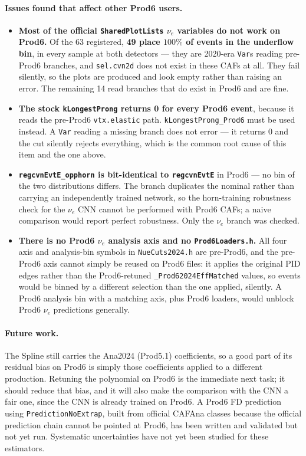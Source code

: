 \documentclass{article}
\begin{document}
\paragraph{Issues found that affect other Prod6 users.}
\begin{itemize}
  \setlength{\itemsep}{1pt}
  \item \textbf{Most of the official \texttt{SharedPlotLists} $\nu_e$ variables do
  not work on Prod6.} Of the 63 registered, \textbf{49 place $100\%$ of events in
  the underflow bin}, in every sample at both detectors --- they are 2020-era
  \texttt{Var}s reading pre-Prod6 branches, and \texttt{sel.cvn2d} does not exist
  in these CAFs at all. They fail silently, so the plots are produced and look
  empty rather than raising an error. The remaining 14 read branches that do
  exist in Prod6 and are fine.
  \item \textbf{The stock \texttt{kLongestProng} returns 0 for every Prod6
  event}, because it reads the pre-Prod6 \texttt{vtx.elastic} path.
  \texttt{kLongestProng\_Prod6} must be used instead. A \texttt{Var} reading a
  missing branch does not error --- it returns 0 and the cut silently rejects
  everything, which is the common root cause of this item and the one above.
  \item \textbf{\texttt{regcvnEvtE\_opphorn} is bit-identical to
  \texttt{regcvnEvtE}} in Prod6 --- no bin of the two distributions differs. The
  branch duplicates the nominal rather than carrying an independently trained
  network, so the horn-training robustness check for the $\nu_e$ CNN cannot be
  performed with Prod6 CAFs; a naive comparison would report perfect robustness.
  Only the $\nu_e$ branch was checked.
  \item \textbf{There is no Prod6 $\nu_e$ analysis axis and no
  \texttt{Prod6Loaders.h}.} All four axis and analysis-bin symbols in
  \texttt{NueCuts2024.h} are pre-Prod6, and the pre-Prod6 axis cannot simply be
  reused on Prod6 files: it applies the original PID edges rather than the
  Prod6-retuned \texttt{\_Prod62024EffMatched} values, so events would be binned
  by a different selection than the one applied, silently. A Prod6 analysis bin
  with a matching axis, plus Prod6 loaders, would unblock Prod6 $\nu_e$
  predictions generally.
\end{itemize}

\paragraph{Future work.}
The Spline still carries the Ana2024 (Prod5.1) coefficients, so a good part of
its residual bias on Prod6 is simply those coefficients applied to a different
production. Retuning the polynomial on Prod6 is the immediate next task; it
should reduce that bias, and it will also make the comparison with the CNN a fair
one, since the CNN is already trained on Prod6. A Prod6 FD prediction using
\texttt{PredictionNoExtrap}, built from official CAFAna classes because the
official prediction chain cannot be pointed at Prod6, has been written and
validated but not yet run. Systematic uncertainties have not yet been studied
for these estimators.
\end{document}
